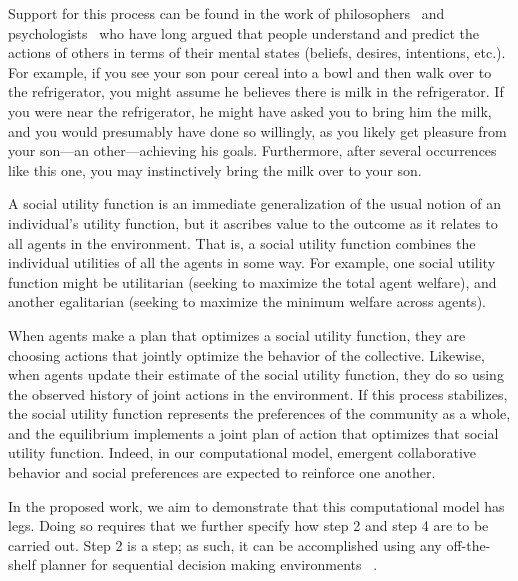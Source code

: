 Support for this process can be found in the work of
philosophers~\cite{dennett87} and psychologists~\cite{heider44} who
have long argued that people understand and predict the actions of
others in terms of their mental states (beliefs, desires, intentions,
etc.).  For example, if you see your son pour cereal into a bowl and
then walk over to the refrigerator, you might assume he believes there
is milk in the refrigerator.  If you were near the refrigerator, he
might have asked you to bring him the milk, and you would presumably
have done so willingly, as you likely get pleasure from your son---an
other---achieving his goals.  Furthermore, after several occurrences
like this one, you may instinctively bring the milk over to your son.

A social utility function is an immediate generalization of the usual
notion of an individual's utility function, but it ascribes value to
the outcome as it relates to all agents in the environment.  That is,
a social utility function combines the individual utilities of all the
agents in some way.  For example, one social utility function might be
utilitarian (seeking to maximize the total agent welfare), and another
egalitarian (seeking to maximize the minimum welfare across agents).

When agents make a plan that optimizes a social utility function, they
are choosing actions that jointly optimize the behavior of the
collective.
Likewise, when
agents update their estimate of the social utility function, they do
so using the observed history of joint actions in the environment.
If this process stabilizes, the social utility function represents the
preferences of the community as a whole, and the equilibrium
implements a joint plan of action that optimizes that social utility
function.  Indeed, in our computational model, emergent collaborative
behavior and social preferences are expected to reinforce one another.

In the proposed work, we aim to demonstrate that this computational
model has legs.  Doing so requires that we further specify how step 2
and step 4 are to be carried out.  Step 2 is a  step;
as such, it can be accomplished using any off-the-shelf planner for
sequential decision making environments~\cite{Bellman!!??}
.

